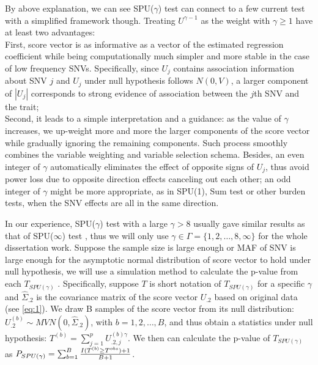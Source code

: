 \documentclass[12pt]{article}
\begin{document}
By above explanation, we can see SPU($\gamma$) test can connect to a few current test with a simplified framework though. Treating $U^{\gamma - 1}$ as the weight with $\gamma \geq 1$ have at least two advantages:\\ 
First, score vector is as informative as a vector of the estimated regression coefficient while being computationally much simpler and more stable in the case of low frequency SNVs. Specifically, since $U_j$ contains association information about SNV $j$ and $U_j$ under null hypothesis follows $N(0, V)$, a larger component of $|U_j|$ corresponds to strong evidence of association between the $j$th SNV and the trait;\\
Second, it leads to a simple interpretation and a guidance: as the value of $\gamma$ increases, we up-weight more and more the larger components of the score vector while gradually ignoring the remaining components. Such process smoothly combines the variable weighting and variable selection schema. Besides, an even integer of $\gamma$ automatically eliminates the effect of opposite signs of $U_j$, thus avoid power loss due to opposite direction effects canceling out each other; an odd integer of $\gamma$ might be more appropriate, as in SPU(1), Sum test or other burden tests, when the SNV effects are all in the same direction.

In our experience, SPU($\gamma$) test with a large $\gamma > 8$ usually gave similar results as that of SPU($\infty$) test \cite{pan2014powerful}, thus we will only use $\gamma \in \Gamma = \{1,2,\ldots,8,\infty \} $ for the whole dissertation work. Suppose the sample size is large enough or MAF of SNV is large enough for the asymptotic normal distribution of score vector to hold under null hypothesis, we will use a simulation method to calculate the p-value from each $T_{ SPU(\gamma) }$ \cite{Lin2005,Seaman2005}. Specifically, suppose $T$ is short notation of $T_{ SPU(\gamma) }$ for a specific $\gamma$ and $\hat{\Sigma}_{.2}$ is the covariance matrix of the score vector $U_{.2}$ based on original data (see \ref{eq:1}). We draw B samples of the score vector from its null distribution: $U_{.2}^{ (b) } \sim MVN \left( 0, \hat{\Sigma}_{.2} \right)$, with $b = 1,2,\ldots,B$, and thus obtain a statistics under null hypothesis: $T ^ {(b)} = \sum_{j=1}^p U^{ (b)\gamma }_{.2, j} $. We then can calculate the p-value of $T_{ SPU(\gamma) }$ as $P_{ SPU(\gamma) } = \sum_{b=1}^B { I(T^{(b)} \geq T ^ {obs} ) + 1  \over B + 1 } $. 
\end{document}
